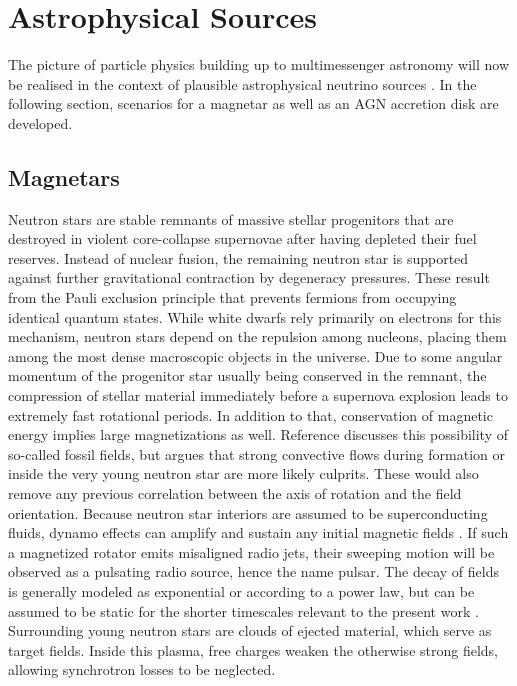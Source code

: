 \section{Astrophysical Sources}
\label{sec:sources}

\enlargethispage{\baselineskip}

The picture of particle physics building up to multimessenger astronomy will now be realised in the context of plausible astrophysical
neutrino sources \cite{Becker_2008}. In the following section, scenarios for a magnetar as well as an AGN accretion disk are developed.



\subsection{Magnetars}
\label{sub:magnetars}

Neutron stars are stable remnants of massive stellar progenitors that are destroyed in violent core-collapse supernovae after having
depleted their fuel reserves. Instead of nuclear fusion, the remaining neutron star is supported against further gravitational
contraction by degeneracy pressures. These result from the Pauli exclusion principle that prevents fermions from occupying identical
quantum states. While white dwarfs rely primarily on electrons for this mechanism, neutron stars depend on the repulsion among
nucleons, placing them among the most dense macroscopic objects in the universe. Due to some angular momentum of the progenitor
star usually being conserved in the remnant, the compression of stellar material immediately before a supernova explosion leads to
extremely fast rotational periods. In addition to that, conservation of magnetic energy implies large magnetizations as well.
Reference \cite{Thompson_1993} discusses this possibility of so-called fossil fields, but argues that strong convective flows
during formation or inside the very young neutron star are more likely culprits. These would also remove any previous correlation
between the axis of rotation and the field orientation. Because neutron star interiors are assumed to be superconducting fluids,
dynamo effects can amplify and sustain any initial magnetic fields \cite{Haskell_2018}. If such a magnetized rotator emits misaligned
radio jets, their sweeping motion will be observed as a pulsating radio source, hence the name pulsar. The decay of fields is generally
modeled as exponential or according to a power law, but can be assumed to be static for the shorter timescales relevant to the present
work \cite{Sang_1990}. Surrounding young neutron stars are clouds of ejected material, which serve as target fields. Inside this plasma,
free charges weaken the otherwise strong fields, allowing synchrotron losses to be neglected.

